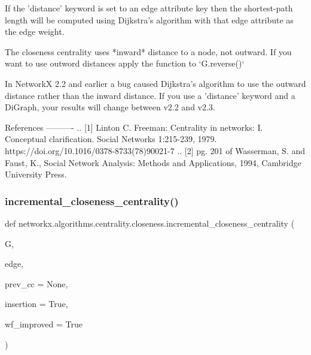\begin{DoxyVerb}
If the 'distance' keyword is set to an edge attribute key then the
shortest-path length will be computed using Dijkstra's algorithm with
that edge attribute as the edge weight.

The closeness centrality uses *inward* distance to a node, not outward.
If you want to use outword distances apply the function to `G.reverse()`

In NetworkX 2.2 and earlier a bug caused Dijkstra's algorithm to use the
outward distance rather than the inward distance. If you use a 'distance'
keyword and a DiGraph, your results will change between v2.2 and v2.3.

References
----------
.. [1] Linton C. Freeman: Centrality in networks: I.
   Conceptual clarification. Social Networks 1:215-239, 1979.
   https://doi.org/10.1016/0378-8733(78)90021-7
.. [2] pg. 201 of Wasserman, S. and Faust, K.,
   Social Network Analysis: Methods and Applications, 1994,
   Cambridge University Press.
\end{DoxyVerb}
 \mbox{\label{namespacenetworkx_1_1algorithms_1_1centrality_1_1closeness_a1c77443fdb449686cfc2c95b1db242ec}} 
\subsubsection{\texorpdfstring{incremental\+\_\+closeness\+\_\+centrality()}{incremental\_closeness\_centrality()}}
{\footnotesize\ttfamily def networkx.\+algorithms.\+centrality.\+closeness.\+incremental\+\_\+closeness\+\_\+centrality (\begin{DoxyParamCaption}\item[{}]{G,  }\item[{}]{edge,  }\item[{}]{prev\+\_\+cc = {\ttfamily None},  }\item[{}]{insertion = {\ttfamily True},  }\item[{}]{wf\+\_\+improved = {\ttfamily True} }\end{DoxyParamCaption})}

